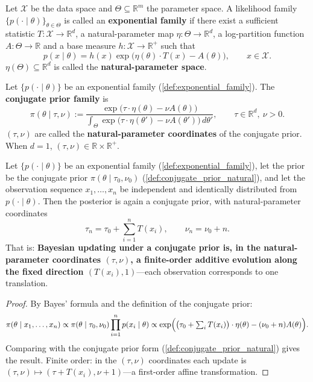 \begin{definition}\label{def:exponential_family}
Let $\mathcal{X}$ be the data space and $\Theta\subseteq\mathbb{R}^m$ the parameter space. A likelihood family $\{p(\cdot\mid\theta)\}_{\theta\in\Theta}$ is called an \textbf{exponential family} if there exist a sufficient statistic $T:\mathcal{X}\to\mathbb{R}^d$, a natural-parameter map $\eta:\Theta\to\mathbb{R}^d$, a log-partition function $A:\Theta\to\mathbb{R}$ and a base measure $h:\mathcal{X}\to\mathbb{R}^+$ such that
\[
p(x\mid\theta) = h(x)\exp\bigl(\eta(\theta)\cdot T(x) - A(\theta)\bigr), \qquad x\in\mathcal{X}.
\]
$\eta(\Theta)\subseteq\mathbb{R}^d$ is called the \textbf{natural-parameter space}.
\end{definition}

\begin{definition}\label{def:conjugate_prior_natural}
Let $\{p(\cdot\mid\theta)\}$ be an exponential family (\cref{def:exponential_family}). The \textbf{conjugate prior family} is
\[
\pi(\theta\mid\tau,\nu) := \frac{\exp\bigl(\tau\cdot\eta(\theta) - \nu A(\theta)\bigr)}{\int_\Theta \exp\bigl(\tau\cdot\eta(\theta') - \nu A(\theta')\bigr)\,d\theta'}, \qquad \tau\in\mathbb{R}^d,\ \nu>0.
\]
$(\tau,\nu)$ are called the \textbf{natural-parameter coordinates} of the conjugate prior. When $d=1$, $(\tau,\nu)\in\mathbb{R}\times\mathbb{R}^+$.
\end{definition}

\begin{theorem}\label{thm:conjugate_exact_finite_order}
Let $\{p(\cdot\mid\theta)\}$ be an exponential family (\cref{def:exponential_family}), let the prior be the conjugate prior $\pi(\theta\mid\tau_0,\nu_0)$ (\cref{def:conjugate_prior_natural}), and let the observation sequence $x_1,\dots,x_n$ be independent and identically distributed from $p(\cdot\mid\theta)$. Then the posterior is again a conjugate prior, with natural-parameter coordinates
\[
\boxed{\ \tau_n = \tau_0 + \sum_{i=1}^n T(x_i), \qquad \nu_n = \nu_0 + n.\ }
\]
That is: \textbf{Bayesian updating under a conjugate prior is, in the natural-parameter coordinates $(\tau,\nu)$, a finite-order additive evolution along the fixed direction $(T(x_i),1)$}---each observation corresponds to one translation.
\end{theorem}

\begin{proof}
By Bayes' formula and the definition of the conjugate prior:
\[
\pi(\theta\mid x_1,\dots,x_n) \propto \pi(\theta\mid\tau_0,\nu_0)\prod_{i=1}^n p(x_i\mid\theta) \propto \exp\Bigl(\bigl(\tau_0 + \textstyle\sum_i T(x_i)\bigr)\cdot\eta(\theta) - (\nu_0+n)A(\theta)\Bigr).
\]
Comparing with the conjugate prior form (\cref{def:conjugate_prior_natural}) gives the result. Finite order: in the $(\tau,\nu)$ coordinates each update is $(\tau,\nu)\mapsto(\tau+T(x_i), \nu+1)$---a first-order affine transformation.
\end{proof}


